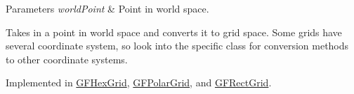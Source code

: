 \begin{DoxyParams}{Parameters}
{\em world\+Point} & Point in world space.\\
\hline
\end{DoxyParams}


Takes in a point in world space and converts it to grid space. Some grids have several coordinate system, so look into the specific class for conversion methods to other coordinate systems. 

Implemented in \hyperlink{class_g_f_hex_grid_a476548c7582c1529de47f31ce891f4fd_a476548c7582c1529de47f31ce891f4fd}{G\+F\+Hex\+Grid}, \hyperlink{class_g_f_polar_grid_a925bc4556e0c7422f476409b4f48067e_a925bc4556e0c7422f476409b4f48067e}{G\+F\+Polar\+Grid}, and \hyperlink{class_g_f_rect_grid_ac668541585726a76ba85d1e15ca45753_ac668541585726a76ba85d1e15ca45753}{G\+F\+Rect\+Grid}.



